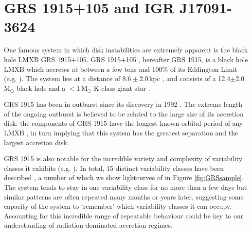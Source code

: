\section{GRS 1915+105 and IGR J17091-3624}

\label{sec:1915}

\par One famous system in which disk instabilities are extremely apparent is the black hole LMXB GRS 1915+105.  GRS 1915+105 \citep{CastroTirado_GRS1915}, hereafter GRS 1915, is a black hole LMXB which accretes at between a few tens and 100\% of its Eddington Limit (e.g. \citealp{Vilhu_SupEd,Done_GRS_HighAcc,Fender_DiskJet}).  The system lies at a distance of $8.6\pm2.0$\,kpc \citep{Reid_Parallax}, and consists of a 12.4$\pm$2.0\,M$_\odot$ black hole and a $<1$\,M$_\odot$ K-class giant star \citep{Reid_Parallax,Ziolkowski_GRSDonor}.
\par GRS 1915 has been in outburst since its discovery in 1992 \citep{CastroTirado_GRS1915}.  The extreme length of the ongoing outburst is believed to be related to the large size of its accretion disk: the components of GRS 1915 have the longest known orbital period of any LMXB \citep{Greiner_BigDisk}, in turn implying that this system has the greatest separation and the largest accretion disk.
\par GRS 1915 is also notable for the incredible variety and complexity of variability classes it exhibits (e.g. \citealp{Yadav_GRSBursts,Belloni_GRS_MI}).  In total, 15 distinct variability classes have been described \citep{Belloni_GRS_MI,KleinWolt_OmegaClass,Hannikainen_NewClass, Pahari_NewClass}, a number of which we show lightcurves of in Figure \ref{fig:GRSsample}.  The system tends to stay in one variability class for no more than a few days but similar patterns are often repeated many months or years later, suggesting some capacity of the system to `remember' which variability classes it can occupy.  Accounting for this incredible range of repeatable behaviour could be key to our understanding of radiation-dominated accretion regimes.

